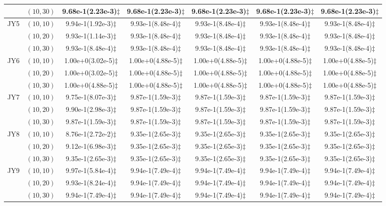\documentclass[review]{elsarticle}
\begin{document}
\begin{table*}[!htb]
{\begin{tabular}{ccccccc}
&$(10,30)$ &9.68e-1(2.23e-3)$\ddagger$ &9.68e-1(2.23e-3)$\ddagger$ &9.68e-1(2.23e-3)$\ddagger$ &9.68e-1(2.23e-3)$\ddagger$ &9.68e-1(2.23e-3)$\ddagger$ \\
\hline  \multirow{3}{*}{JY5}
&$(10,10)$ &9.94e-1(1.92e-3)$\ddagger$ &9.93e-1(8.48e-4)$\ddagger$ &9.93e-1(8.48e-4)$\ddagger$ &9.93e-1(8.48e-4)$\ddagger$ &9.93e-1(8.48e-4)$\ddagger$ \\
&$(10,20)$ &9.93e-1(1.14e-3)$\ddagger$ &9.93e-1(8.48e-4)$\ddagger$ &9.93e-1(8.48e-4)$\ddagger$ &9.93e-1(8.48e-4)$\ddagger$ &9.93e-1(8.48e-4)$\ddagger$ \\
&$(10,30)$ &9.93e-1(8.48e-4)$\ddagger$ &9.93e-1(8.48e-4)$\ddagger$ &9.93e-1(8.48e-4)$\ddagger$ &9.93e-1(8.48e-4)$\ddagger$ &9.93e-1(8.48e-4)$\ddagger$ \\
\hline  \multirow{3}{*}{JY6}
&$(10,10)$ &1.00e+0(3.02e-5)$\ddagger$ &1.00e+0(4.88e-5)$\ddagger$ &1.00e+0(4.88e-5)$\ddagger$ &1.00e+0(4.88e-5)$\ddagger$ &1.00e+0(4.88e-5)$\ddagger$ \\
&$(10,20)$ &1.00e+0(3.02e-5)$\ddagger$ &1.00e+0(4.88e-5)$\ddagger$ &1.00e+0(4.88e-5)$\ddagger$ &1.00e+0(4.88e-5)$\ddagger$ &1.00e+0(4.88e-5)$\ddagger$ \\
&$(10,30)$ &1.00e+0(4.88e-5)$\ddagger$ &1.00e+0(4.88e-5)$\ddagger$ &1.00e+0(4.88e-5)$\ddagger$ &1.00e+0(4.88e-5)$\ddagger$ &1.00e+0(4.88e-5)$\ddagger$ \\
\hline  \multirow{3}{*}{JY7}
&$(10,10)$ &9.75e-1(8.07e-3)$\ddagger$ &9.87e-1(1.59e-3)$\ddagger$ &9.87e-1(1.59e-3)$\ddagger$ &9.87e-1(1.59e-3)$\ddagger$ &9.87e-1(1.59e-3)$\ddagger$ \\
&$(10,20)$ &9.90e-1(2.98e-3)$\ddagger$ &9.87e-1(1.59e-3)$\ddagger$ &9.87e-1(1.59e-3)$\ddagger$ &9.87e-1(1.59e-3)$\ddagger$ &9.87e-1(1.59e-3)$\ddagger$ \\
&$(10,30)$ &9.87e-1(1.59e-3)$\ddagger$ &9.87e-1(1.59e-3)$\ddagger$ &9.87e-1(1.59e-3)$\ddagger$ &9.87e-1(1.59e-3)$\ddagger$ &9.87e-1(1.59e-3)$\ddagger$ \\
\hline  \multirow{3}{*}{JY8}
&$(10,10)$ &8.76e-1(2.72e-2)$\ddagger$ &9.35e-1(2.65e-3)$\ddagger$ &9.35e-1(2.65e-3)$\ddagger$ &9.35e-1(2.65e-3)$\ddagger$ &9.35e-1(2.65e-3)$\ddagger$ \\
&$(10,20)$ &9.12e-1(6.98e-3)$\ddagger$ &9.35e-1(2.65e-3)$\ddagger$ &9.35e-1(2.65e-3)$\ddagger$ &9.35e-1(2.65e-3)$\ddagger$ &9.35e-1(2.65e-3)$\ddagger$ \\
&$(10,30)$ &9.35e-1(2.65e-3)$\ddagger$ &9.35e-1(2.65e-3)$\ddagger$ &9.35e-1(2.65e-3)$\ddagger$ &9.35e-1(2.65e-3)$\ddagger$ &9.35e-1(2.65e-3)$\ddagger$ \\
\hline  \multirow{3}{*}{JY9}
&$(10,10)$ &9.97e-1(5.84e-4)$\ddagger$ &9.94e-1(7.49e-4)$\ddagger$ &9.94e-1(7.49e-4)$\ddagger$ &9.94e-1(7.49e-4)$\ddagger$ &9.94e-1(7.49e-4)$\ddagger$ \\
&$(10,20)$ &9.93e-1(8.24e-4)$\ddagger$ &9.94e-1(7.49e-4)$\ddagger$ &9.94e-1(7.49e-4)$\ddagger$ &9.94e-1(7.49e-4)$\ddagger$ &9.94e-1(7.49e-4)$\ddagger$ \\
&$(10,30)$ &9.94e-1(7.49e-4)$\ddagger$ &9.94e-1(7.49e-4)$\ddagger$ &9.94e-1(7.49e-4)$\ddagger$ &9.94e-1(7.49e-4)$\ddagger$ &9.94e-1(7.49e-4)$\ddagger$ \\


\end{tabular}}
\end{table*}
\end{document}
